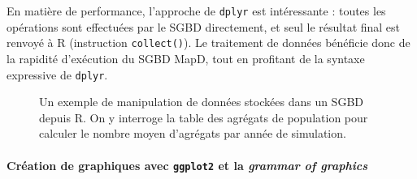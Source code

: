 	En matière de performance, l'approche de \texttt{dplyr} est intéressante : toutes les opérations sont effectuées par le SGBD directement, et seul le résultat final est renvoyé à R (instruction \texttt{collect()}).
	Le traitement de données bénéficie donc de la rapidité d'exécution du SGBD MapD, tout en profitant de la syntaxe expressive de \texttt{dplyr}.

		\begin{figure}[H]
			\centering
			\hspace{5pt}
			\hspace{5pt}
			\caption{Un exemple de manipulation de données stockées dans un SGBD depuis R. On y interroge la table des agrégats de population pour calculer le nombre moyen d'agrégats par année de simulation.}
			\label{fig:dml-simedb}
		\end{figure}

	\clearpage
	\paragraph*{Création de graphiques avec \texttt{ggplot2} et la \og \textit{grammar of graphics}\fg{}}
	
